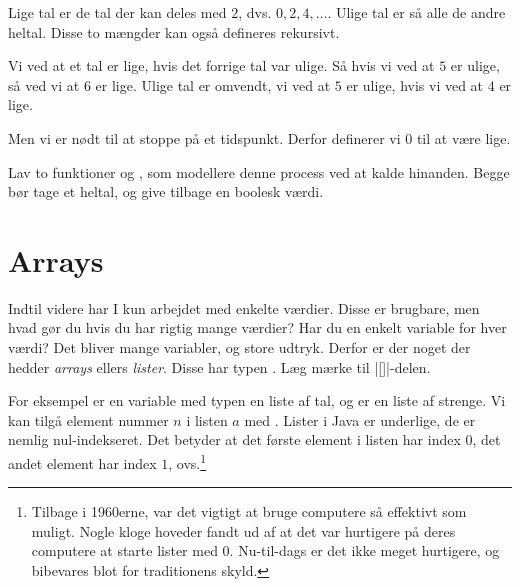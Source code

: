 	\begin{exercise}
		Lige tal er de tal der kan deles med \(2\), dvs. \(0, 2, 4, \dots\).
		Ulige tal er så alle de andre heltal. Disse to mængder kan også defineres
		rekursivt.

		Vi ved at et tal er lige, hvis det forrige tal var ulige. Så hvis vi ved
		at \(5\) er ulige, så ved vi at \(6\) er lige. Ulige tal er omvendt, vi
		ved at \(5\) er ulige, hvis vi ved at \(4\) er lige.

		Men vi er nødt til at stoppe på et tidspunkt. Derfor definerer vi
		\(0\) til at være lige.

		Lav to funktioner  og , som modellere
		denne process ved at kalde hinanden. Begge bør tage et heltal, og give
		tilbage en boolesk værdi.


	\end{exercise}


\section{Arrays}



    Indtil videre har I kun arbejdet med enkelte værdier. Disse er
    brugbare, men hvad gør du hvis du har rigtig mange værdier? Har du
    en enkelt variable for hver værdi? Det bliver mange variabler, og
    store udtryk. Derfor er der noget der hedder \emph{arrays} ellers
    \emph{lister}. Disse har typen . Læg mærke til
    \JavaInline|[]|-delen.

    For eksempel er en variable med typen  en liste
    af tal, og  er en liste af strenge. Vi kan
    tilgå element nummer \(n\) i listen \(a\) med .
    Lister i Java er underlige, de er nemlig nul-indekseret. Det betyder
    at det første element i listen har index \(0\), det andet element har
    index \(1\), ovs.\footnote{Tilbage i 1960erne, var det vigtigt at
    bruge computere så effektivt som muligt. Nogle kloge hoveder
    fandt ud af at det var hurtigere på deres computere at starte
    lister med 0. Nu-til-dags er det ikke meget hurtigere, og
    bibevares blot for traditionens skyld.}

